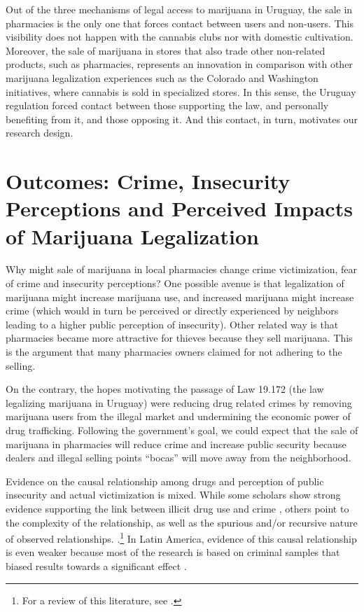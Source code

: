 \documentclass[11pt]{article}
\begin{document}
Out of the three mechanisms of legal access to marijuana in Uruguay, the sale in pharmacies is the only one that forces contact between users and non-users. This visibility does not happen with the cannabis clubs nor with domestic cultivation. Moreover, the sale of marijuana in stores that also trade other non-related products, such as pharmacies, represents an innovation in comparison with other marijuana legalization experiences such as the Colorado and Washington initiatives, where cannabis is sold in specialized stores. In this sense, the Uruguay regulation forced contact between those supporting the law, and personally benefiting from it, and those opposing it. And this contact, in turn, motivates our research design.

\section{Outcomes: Crime, Insecurity Perceptions and Perceived Impacts of Marijuana Legalization}

Why might sale of marijuana in local pharmacies change crime victimization, fear of crime and insecurity perceptions? One possible avenue is that legalization of marijuana might increase marijuana use, and increased marijuana might increase crime (which would in turn be perceived or directly experienced by neighbors leading to a higher public perception of insecurity). Other related way is that pharmacies became more attractive for thieves because they sell marijuana. This is the argument that many pharmacies owners claimed for not adhering to the selling.

On the contrary, the hopes motivating the passage of Law 19.172 (the law legalizing marijuana in Uruguay) were reducing drug related crimes by removing marijuana users from the illegal market and undermining the economic power of drug trafficking. Following the government's goal, we could expect that the sale of marijuana in pharmacies will reduce crime and increase public security because dealers and illegal selling points ``bocas'' will move away from the neighborhood.

Evidence on the causal relationship among drugs and perception of public insecurity and actual victimization is mixed. While some scholars show strong evidence supporting the link between illicit drug use and crime \citep{white2000dynamics}, others point to the complexity of the relationship, as well as the spurious and/or recursive nature of observed relationships. \citep{gottfredson1990general, mcbride1993drugs}.\footnote{For a review of this literature, see \citet{brothers2003substance}.} In Latin America, evidence of this causal relationship is even weaker because most of the research is based on criminal samples that biased results towards a significant effect \citet{trajtenberg2018self}.
\end{document}
